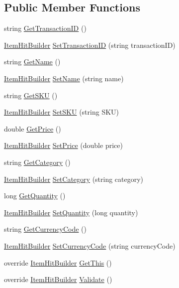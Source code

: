 \subsection*{Public Member Functions}
\begin{DoxyCompactItemize}
\item 
string \hyperlink{class_item_hit_builder_a1a331446ed79acb6a693815211cc6ab9}{Get\+Transaction\+ID} ()
\item 
\hyperlink{class_item_hit_builder}{Item\+Hit\+Builder} \hyperlink{class_item_hit_builder_ab6680f6f137e4121aa34d390514903ca}{Set\+Transaction\+ID} (string transaction\+ID)
\item 
string \hyperlink{class_item_hit_builder_ad199a43b0e19daf1880157cd8e3beb35}{Get\+Name} ()
\item 
\hyperlink{class_item_hit_builder}{Item\+Hit\+Builder} \hyperlink{class_item_hit_builder_a1daa682cb7be27b2e92a1833e08913c5}{Set\+Name} (string name)
\item 
string \hyperlink{class_item_hit_builder_ab8c7b6d0a36421f1a118ad20d728d771}{Get\+S\+KU} ()
\item 
\hyperlink{class_item_hit_builder}{Item\+Hit\+Builder} \hyperlink{class_item_hit_builder_a777fd7e2d47c6bb3603baee088fe189f}{Set\+S\+KU} (string S\+KU)
\item 
double \hyperlink{class_item_hit_builder_a9c2ca44ddf85a97c5621e75fc52aab52}{Get\+Price} ()
\item 
\hyperlink{class_item_hit_builder}{Item\+Hit\+Builder} \hyperlink{class_item_hit_builder_a2358c13bacae62f873c25e5e17e02b35}{Set\+Price} (double price)
\item 
string \hyperlink{class_item_hit_builder_a805873da652d4e67512f2686a0c472a6}{Get\+Category} ()
\item 
\hyperlink{class_item_hit_builder}{Item\+Hit\+Builder} \hyperlink{class_item_hit_builder_a375deff20797ca5a3c38a8c283923806}{Set\+Category} (string category)
\item 
long \hyperlink{class_item_hit_builder_a980087be9ca9c9ecd215ab5072527d92}{Get\+Quantity} ()
\item 
\hyperlink{class_item_hit_builder}{Item\+Hit\+Builder} \hyperlink{class_item_hit_builder_af7fa25cccc48cd5dd05c1132644b34a0}{Set\+Quantity} (long quantity)
\item 
string \hyperlink{class_item_hit_builder_ad9fbd4795b8497a94cad7d93cfefb020}{Get\+Currency\+Code} ()
\item 
\hyperlink{class_item_hit_builder}{Item\+Hit\+Builder} \hyperlink{class_item_hit_builder_a8a7d3842f29bf6cf999a6419df955e75}{Set\+Currency\+Code} (string currency\+Code)
\item 
override \hyperlink{class_item_hit_builder}{Item\+Hit\+Builder} \hyperlink{class_item_hit_builder_a1e4bf966bf09e948db5d5eef3f56358f}{Get\+This} ()
\item 
override \hyperlink{class_item_hit_builder}{Item\+Hit\+Builder} \hyperlink{class_item_hit_builder_acaaf2b68e53e2c9275f2e9020f97ddcf}{Validate} ()
\end{DoxyCompactItemize}


